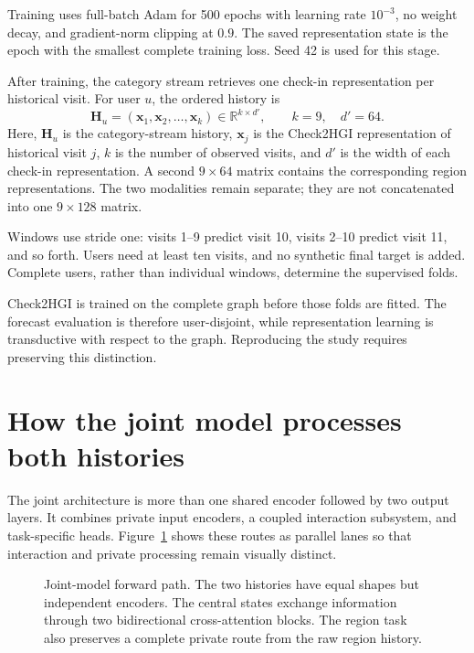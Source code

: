 Training uses full-batch Adam for 500 epochs with learning rate $10^{-3}$, no weight
decay, and gradient-norm clipping at $0.9$. The saved representation state is the
epoch with the smallest complete training loss. Seed 42 is used for this stage.

After training, the category stream retrieves one check-in representation per
historical visit. For user $u$, the ordered history is
\begin{equation}
    \mathbf{H}_u=(\mathbf{x}_1,\mathbf{x}_2,\ldots,\mathbf{x}_k)
    \in\mathbb{R}^{k\times d'},\qquad k=9,\quad d'=64.
    \label{eq:apx-user-sequence}
\end{equation}
Here, $\mathbf{H}_u$ is the category-stream history, $\mathbf{x}_j$ is the
Check2HGI representation of historical visit $j$, $k$ is the number of observed
visits, and $d'$ is the width of each check-in representation. A second
$9\times64$ matrix contains the corresponding region representations. The two
modalities remain separate; they are not concatenated into one $9\times128$
matrix.

Windows use stride one: visits 1--9 predict visit 10, visits 2--10 predict visit
11, and so forth. Users need at least ten visits, and no synthetic final target is
added. Complete users, rather than individual windows, determine the supervised
folds.

Check2HGI is trained on the complete graph before those folds are fitted. The
forecast evaluation is therefore user-disjoint, while representation learning is
transductive with respect to the graph. Reproducing the study requires preserving
this distinction.

\section{How the joint model processes both histories}
\label{sec:apx-joint-forward}

The joint architecture is more than one shared encoder followed by two output
layers. It combines private input encoders, a coupled interaction subsystem, and
task-specific heads. Figure~\ref{fig:apx-joint-flow} shows these routes as parallel
lanes so that interaction and private processing remain visually distinct.

\begin{figure}[H]
    \centering
    
    \caption{Joint-model forward path. The two histories have equal shapes but
    independent encoders. The central states exchange information through two
    bidirectional cross-attention blocks. The region task also preserves a complete
    private route from the raw region history.}
    \label{fig:apx-joint-flow}
\end{figure}


